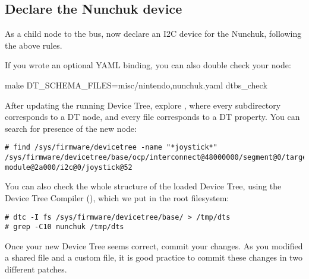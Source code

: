 \subsection{Declare the Nunchuk device}

As a child node to the  bus, now declare an I2C device
for the Nunchuk, following the above rules.

If you wrote an optional YAML binding, you can also double check your
node:
\begin{bashinput}
make DT_SCHEMA_FILES=misc/nintendo,nunchuk.yaml dtbs_check
\end{bashinput}

After updating the running Device Tree, explore
, where every subdirectory corresponds to
a DT node, and every file corresponds to a DT property. You can search
for presence of the new  node:

{\small
\begin{verbatim}
# find /sys/firmware/devicetree -name "*joystick*"
/sys/firmware/devicetree/base/ocp/interconnect@48000000/segment@0/target-module@2a000/i2c@0/joystick@52
\end{verbatim}
}

You can also check the whole structure of the loaded Device Tree, using
the Device Tree Compiler (), which we put in the root
filesystem:
\begin{verbatim}
# dtc -I fs /sys/firmware/devicetree/base/ > /tmp/dts
# grep -C10 nunchuk /tmp/dts
\end{verbatim}

Once your new Device Tree seems correct, commit your changes. As you
modified a shared file and a custom file, it is good practice to commit
these changes in two different patches.
